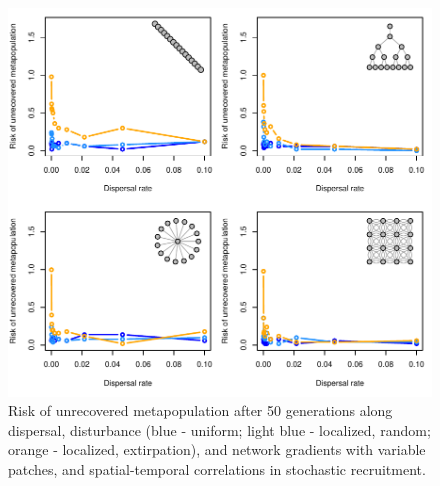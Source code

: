 \documentclass[]{article}
\begin{document}
\begin{figure}[H]

{\centering \includegraphics{Managing_for_ecological_surprises_in_metapopulations_makeHTML_files/figure-latex/state shifts with variable patches and space-time stochasticity-1} 

}

\caption{Risk of unrecovered metapopulation after 50 generations along dispersal, disturbance (blue - uniform; light blue - localized, random; orange - localized, extirpation), and network gradients with variable patches, and spatial-temporal correlations in stochastic recruitment.}\label{fig:state shifts with variable patches and space-time stochasticity}
\end{figure}
\end{document}
